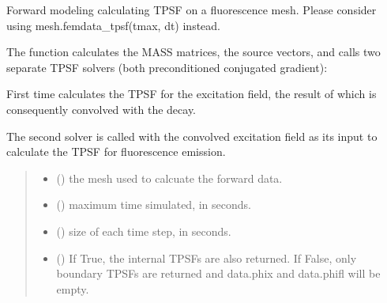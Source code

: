 \documentclass[letterpaper,10pt,english]{sphinxmanual}
\begin{document}
\begin{fulllineitems}
\label{\detokenize{_autosummary/nirfasterff.forward.femdata.femdata_fl_TR:nirfasterff.forward.femdata.femdata_fl_TR}}
\pysigstartsignatures
{}
\pysigstopsignatures
\sphinxAtStartPar
Forward modeling calculating TPSF on a fluorescence mesh. Please consider using mesh.femdata\_tpsf(tmax, dt) instead.

\sphinxAtStartPar
The function calculates the MASS matrices, the source vectors, and calls two separate TPSF solvers (both preconditioned conjugated gradient):

\sphinxAtStartPar
First time calculates the TPSF for the excitation field, the result of which is consequently convolved with the decay.

\sphinxAtStartPar
The second solver is called with the convolved excitation field as its input to calculate the TPSF for fluorescence emission.
\begin{quote}\begin{description}
\begin{itemize}
\item {} 
\sphinxAtStartPar
{} () \textendash{} the mesh used to calcuate the forward data.

\item {} 
\sphinxAtStartPar
{} () \textendash{} maximum time simulated, in seconds.

\item {} 
\sphinxAtStartPar
{} () \textendash{} size of each time step, in seconds.

\item {} 
\sphinxAtStartPar
{} (\sphinxstyleliteralemphasis{\sphinxupquote{, }}) \textendash{} 
\sphinxAtStartPar
If True, the internal TPSFs are also returned. If False, only boundary TPSFs are returned and data.phix and data.phifl will be empty.


\end{itemize}
\end{description}
\end{quote}
\end{fulllineitems}
\end{document}

